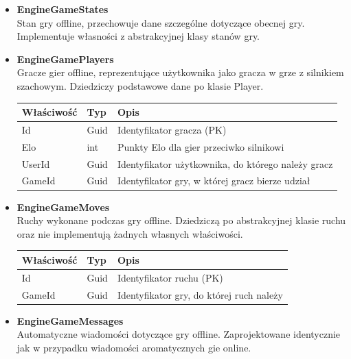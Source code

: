 \documentclass[twoside]{projektInzynierskiMS1}
\begin{document}
\begin{itemize}
    \item \textbf{EngineGameStates}\\
    Stan gry offline, przechowuje dane szczególne dotyczące obecnej gry. Implementuje własności z abstrakcyjnej klasy stanów gry.

    \item \textbf{EngineGamePlayers}\\
    Gracze gier offline, reprezentujące użytkownika jako gracza w grze z silnikiem szachowym. Dziedziczy podstawowe dane po klasie Player.
    \renewcommand{\arraystretch}{1.2}
    \begin{longtable}{|m{4cm}|m{2cm}|m{8cm}|}
        \hline
        \rowcolor{lightgray}
        \textbf{Właściwość} & \textbf{Typ} & \textbf{Opis} \\ \hline
        \endhead
        \hline
        Id & Guid & Identyfikator gracza (PK) \\ \hline
        Elo & int & Punkty Elo dla gier przeciwko silnikowi \\ \hline
        UserId & Guid & Identyfikator użytkownika, do którego należy gracz \\ \hline
        GameId & Guid & Identyfikator gry, w której gracz bierze udział \\ \hline
    \end{longtable}
    
    \item \textbf{EngineGameMoves}\\
    Ruchy wykonane podczas gry offline. Dziedziczą po abstrakcyjnej klasie ruchu oraz nie implementują żadnych własnych właściwości.
    \renewcommand{\arraystretch}{1.2}
    \begin{longtable}{|m{4cm}|m{2cm}|m{8cm}|}
        \hline
        \rowcolor{lightgray}
        \textbf{Właściwość} & \textbf{Typ} & \textbf{Opis} \\ \hline
        \endhead
        \hline
        Id & Guid & Identyfikator ruchu (PK) \\ \hline
        GameId & Guid & Identyfikator gry, do której ruch należy \\ \hline
    \end{longtable}
    
    \item \textbf{EngineGameMessages}\\
    Automatyczne wiadomości dotyczące gry offline. Zaprojektowane identycznie jak w przypadku wiadomości aromatycznych gie online.
    
\end{itemize}
\end{document}
